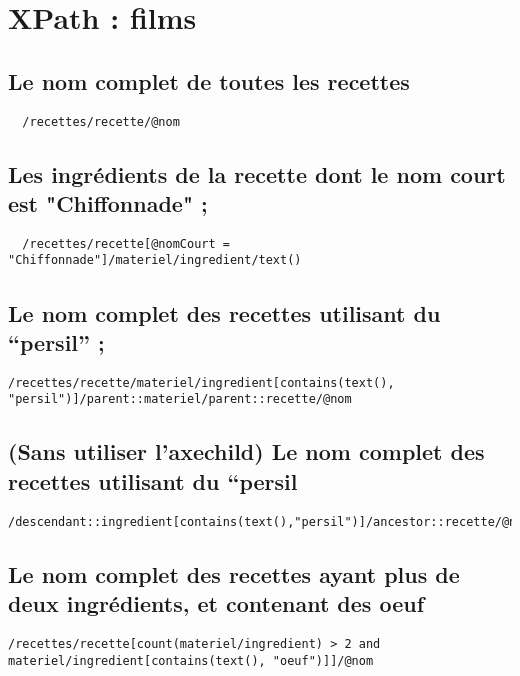 \chapter{XPath : films}

\section{Le nom complet de toutes les recettes}
\begin{verbatim}
  /recettes/recette/@nom
\end{verbatim}

\section{Les ingrédients de la recette dont le nom court est "Chiffonnade" ;}
\begin{verbatim}
  /recettes/recette[@nomCourt = "Chiffonnade"]/materiel/ingredient/text()
\end{verbatim}

\section{Le nom complet des recettes utilisant du “persil” ;}
\begin{verbatim}
/recettes/recette/materiel/ingredient[contains(text(), "persil")]/parent::materiel/parent::recette/@nom
\end{verbatim}

\section{(Sans utiliser l’axechild) Le nom complet des recettes utilisant du “persil}
\begin{verbatim}
/descendant::ingredient[contains(text(),"persil")]/ancestor::recette/@nom
\end{verbatim}

\section{Le nom complet des recettes ayant plus de deux ingrédients, et contenant des oeuf}
\begin{verbatim}
/recettes/recette[count(materiel/ingredient) > 2 and materiel/ingredient[contains(text(), "oeuf")]]/@nom
\end{verbatim}


